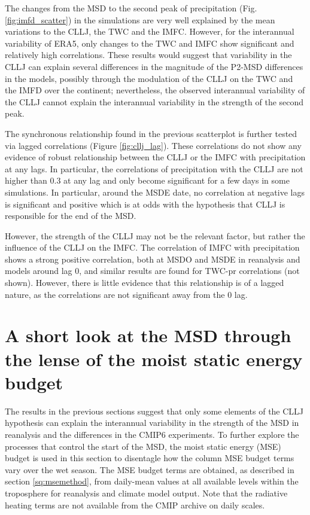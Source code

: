 The changes from the MSD to the second peak of precipitation (Fig. \ref{fig:imfd_scatter}) in the simulations are very well explained by the mean variations to the CLLJ, the TWC and the IMFC. However, for the interannual variability of ERA5, only changes to the TWC and IMFC show significant and relatively high correlations. These results would suggest that variability in the CLLJ can explain several differences in the magnitude of the P2-MSD differences in the models, possibly through the modulation of the CLLJ on the TWC and the IMFD over the continent; nevertheless, the observed interannual variability of the CLLJ cannot explain the interannual variability in the strength of the second peak. %

The synchronous relationship found in the previous scatterplot is further tested via lagged correlations (Figure \ref{fig:cllj_lag}). These correlations do not show any evidence of robust relationship between the CLLJ or the IMFC with precipitation at any lags. In particular, the correlations of precipitation with the CLLJ are not higher than 0.3 at any lag and only become significant for a few days in some simulations. In particular, around the MSDE date, no correlation at negative lags is significant and positive which is at odds with the hypothesis that CLLJ is responsible for the end of the MSD. 

However, the strength of the CLLJ may not be the relevant factor, but rather the influence of the CLLJ on the IMFC. The correlation of IMFC with precipitation shows a strong positive correlation, both at MSDO and MSDE in reanalysis and models around lag 0, and similar results are found for TWC-pr correlations (not shown). However, there is little evidence that this relationship is of a lagged nature, as the correlations are not significant away from the 0 lag. 



\section{A short look at the MSD through the lense of the moist static energy budget}

The results in the previous sections suggest that only some elements of the CLLJ hypothesis can explain the interannual variability in the strength of the MSD in reanalysis and the differences in the CMIP6 experiments. 
To further explore the processes that control the start of the MSD, the moist static energy (MSE) budget is used in this section to disentagle how the column MSE budget terms vary over the wet season.  The MSE budget terms are obtained, as described in section \ref{sq:msemethod}, from daily-mean values at all available levels within the troposphere for reanalysis and climate model output. Note that the radiative heating terms are not available from the CMIP archive on daily scales.


